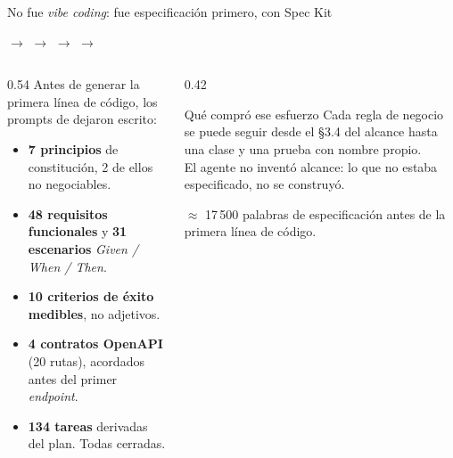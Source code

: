 \begin{frame}{No fue \emph{vibe coding}: fue especificación primero, con Spec Kit}

  \begin{center}\footnotesize
     $\rightarrow$ \alert{} $\rightarrow$
     $\rightarrow$  $\rightarrow$ 
  \end{center}

  \vspace{2pt}
  \begin{columns}[T]
    \begin{column}{0.54\textwidth}
      {\footnotesize Antes de generar la primera línea de código, los prompts
      de  dejaron escrito:}
      \begin{itemize}\scriptsize
        \item \textbf{7 principios} de constitución, 2 de ellos no negociables.
        \item \textbf{48 requisitos funcionales} y \textbf{31 escenarios}
              \emph{Given / When / Then}.
        \item \textbf{10 criterios de éxito medibles}, no adjetivos.
        \item \textbf{4 contratos OpenAPI} (20 rutas), acordados antes del
              primer \emph{endpoint}.
        \item \textbf{134 tareas} derivadas del plan. Todas cerradas.
      \end{itemize}
    \end{column}
    \begin{column}{0.42\textwidth}
      \begin{block}{Qué compró ese esfuerzo}
        \scriptsize
        Cada regla de negocio se puede seguir desde el §3.4 del alcance hasta
        una clase y una prueba con nombre propio.\\[3pt]
        El agente no inventó alcance: lo que no estaba especificado, no se
        construyó.
      \end{block}
      {\scriptsize\color{textoSuave} $\approx$ 17\,500 palabras de
      especificación antes de la primera línea de código.}
    \end{column}
  \end{columns}
\end{frame}
